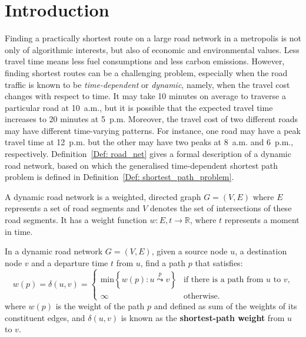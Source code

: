 \chapter{Introduction}

Finding a practically shortest route on a large road network in a metropolis is not only of algorithmic interests, but also of economic and environmental values. Less travel time means less fuel consumptions and less carbon emissions. However, finding shortest routes can be a challenging problem, especially when the road traffic is known to be \emph{time-dependent} or \emph{dynamic}, namely, when the travel cost changes with respect to time. It may take 10 minutes on average to traverse a particular road at 10~a.m., but it is possible that the expected travel time increases to 20 minutes at 5~p.m. Moreover, the travel cost of two different roads may have different time-varying patterns. For instance, one road may have a peak travel time at 12~p.m. but the other may have two peaks at 8~a.m. and 6~p.m., respectively. Definition~\ref{Def: road_net} gives a formal description of a dynamic road network, based on which the generalised time-dependent shortest path problem is defined in Definition~\ref{Def: shortest_path_problem}.

\begin{defn}\label{Def: road_net}
A dynamic road network is a weighted, directed graph $G=(V,E)$ where $E$ represents a set of road segments and $V$ denotes the set of intersections of these road segments. It has a weight function $w : E,t \rightarrow \mathbb{R}$, where $t$ represents a moment in time. 
\end{defn}

\begin{defn}\label{Def: shortest_path_problem}
In a dynamic road network $G=(V,E)$, given a source node $u$, a destination node $v$ and a departure time $t$ from $u$, find a path $p$ that satisfies:
\begin{equation}
w(p)=\delta(u,v)=
\begin{cases}
\text{min}\left\{w(p): u\overset{p}{\leadsto}v \right\} &\text{if there is a path from $u$ to $v$,}\\
\infty &\text{otherwise.}
\end{cases}
\end{equation}
where $w(p)$ is the weight of the path $p$ and defined as sum of the weights of its constituent edges, and $\delta(u,v)$ is known as the \textbf{shortest-path weight} from $u$ to $v$.
\end{defn}

